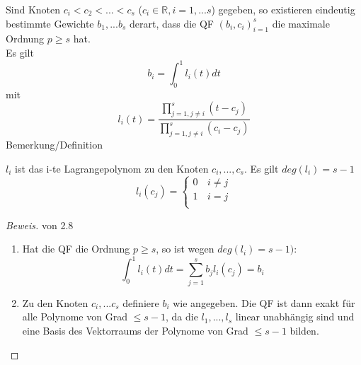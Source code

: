 \begin{theorem}
Sind Knoten $c_i < c_2 < ... < c_s$ ($c_i \in \mathbb{R}, i = 1,...s$) gegeben, so existieren eindeutig bestimmte Gewichte $b_1 ,...b_s$ derart, dass die QF $(b_i, c_i)_{i=1}^s$ die maximale Ordnung $p \geq s$ hat. \\
Es gilt $$b_i = \int_0^1 l_i(t) dt$$ mit $$l_i(t) = \frac{\prod_{j=1, j\neq i}^s (t-c_j)}{\prod_{j=1, j\neq i}^s (c_i-c_j)}$$
Bemerkung/Definition
\begin{description}
  \item $l_i$ ist das i-te Lagrangepolynom zu den Knoten $c_i, ...,c_s$. Es gilt $deg(l_i) = s-1$ 
  $$l_i(c_j) = \left\{
\begin{array}{ll}
0 & \,i \neq j \\
1 & \, i = j\\
\end{array}
\right. $$
\end{description}

\begin{proof}[Beweis] von 2.8 \\
\begin{enumerate}
  \item Hat die QF die Ordnung $p \geq s$, so ist wegen $deg(l_i) = s-1)$:
  $$ \int_0^1 l_i(t) dt = \sum_{j=1}^s b_j l_i(c_j) = b_i$$
  \item Zu den Knoten $c_i, ...c_s$ definiere $b_i$ wie angegeben. Die QF ist dann exakt für alle Polynome von Grad $ \leq s-1$, da die $l_1, ...,l_s$ linear unabhängig sind und eine Basis des Vektorraums der Polynome von Grad $\leq s-1$ bilden.
\end{enumerate}
\end{proof}
\end{theorem}
